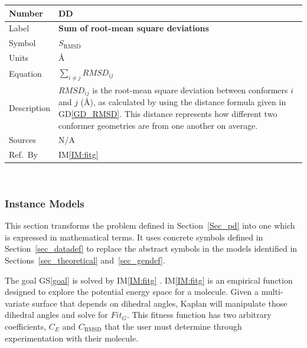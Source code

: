 \documentclass[12pt]{article}
\newcommand{\colAwidth}{0.13\textwidth}
\newcommand{\colBwidth}{0.82\textwidth}
\newcounter{defnum} %
\newcommand{\dref}[1]{GD\ref{#1}}
\newcounter{datadefnum} %
\newcommand{\gsref}[1]{GS\ref{#1}}
\newcommand{\iref}[1]{IM\ref{#1}}
\newcommand{\progname}{Kaplan} %
\begin{document}
\noindent
\begin{minipage}{\textwidth}
	\renewcommand*{\arraystretch}{1.5}
	\begin{tabular}{| p{\colAwidth} | p{\colBwidth}|}
		\hline
		\rowcolor[gray]{0.9}
		Number & DD{datadefnum}\thedatadefnum \label{Sum_RMSD}\\
		\hline
		Label & \bf Sum of root-mean square deviations \\
		\hline
		Symbol & $S_\text{RMSD}$\\
		\hline
		Units & \si{\angstrom}\\
		\hline
		Equation & $\sum\limits_{i\neq j}RMSD_{ij}$ \\
		\hline
		Description & 
		$RMSD_{ij}$ is the root-mean square deviation between conformers $i$ 
		and $j$ (\si{\angstrom}), as calculated by using the distance formula 
		given in \dref{GD_RMSD}. This 
		distance represents how different two conformer geometries are from one 
		another on average.
		\\
		\hline
		Sources& N/A \\
		\hline
		Ref.\ By & \iref{IM:fitg}\\
		\hline
	\end{tabular}
\end{minipage}\\

\subsubsection{Instance Models} \label{sec_instance}    

This section transforms the problem defined in Section~\ref{Sec_pd} into 
one which is expressed in mathematical terms. It uses concrete symbols defined 
in Section~\ref{sec_datadef} to replace the abstract symbols in the models 
identified in Sections~\ref{sec_theoretical} and~\ref{sec_gendef}.

The goal \gsref{goal}  is solved by \iref{IM:fitg} 
. \iref{IM:fitg} is an empirical function designed to explore the 
  potential energy space for a molecule. Given a multi-variate surface that 
  depends on dihedral angles, \progname{} will manipulate those dihedral angles 
  and solve for 
  $Fit_G$. This fitness function has two arbitrary coefficients, $C_E$ and 
  $C_\text{RMSD}$ that the user must determine through experimentation with their 
  molecule. 
\end{document}
